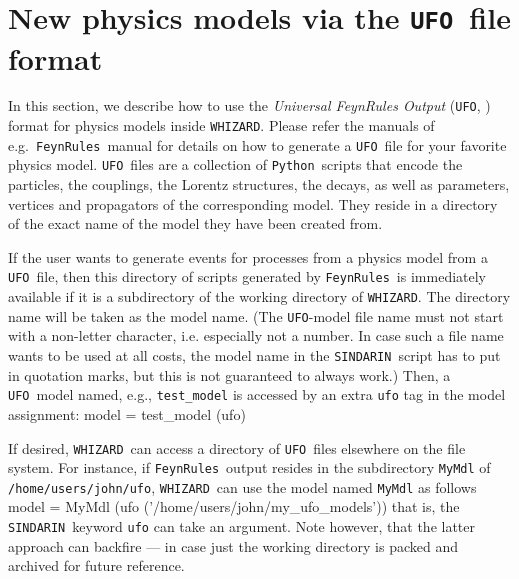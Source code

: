 \documentclass[12pt]{book}
\newenvironment{Code}%
  {\begingroup\footnotesize
   \quote
   \Verbatim[frame=single]}%
  {\endVerbatim
   \endquote
   \endgroup\noindent}
\newcommand{\ttt}[1]{\texttt{#1}}
\newcommand{\whizard}{\ttt{WHIZARD}}
\newcommand{\FeynRules}{\ttt{FeynRules}}
\newcommand{\UFO}{\ttt{UFO}}
\newcommand{\sindarin}{\ttt{SINDARIN}}
\newcommand{\python}{\ttt{Python}}
\begin{document}

\section{New physics models via the \UFO\ file format}
\label{sec:ufo}

In this section, we describe how to use the {\em Universal FeynRules
Output} (\UFO, \cite{Degrande:2011ua,Darme:2023jdn}) format for physics models
inside \whizard. Please refer the manuals of e.g.~\FeynRules\ manual
for details on how to generate a \UFO\ file for your favorite physics
model. \UFO\ files are a collection of \python\ scripts that
encode the particles, the couplings, the Lorentz structures, the
decays, as well as parameters, vertices and propagators of the
corresponding model. They reside in a directory of the exact name of
the model they have been created from.

If the user wants to generate events for processes from a physics
model from a \UFO\ file, then this directory of scripts generated by
\FeynRules\ is immediately available if it is a subdirectory of the working
directory of \whizard.  The directory name will be taken as the model
name. (The \UFO-model file name must not start with a
  non-letter character, i.e. especially not a number.  In case such a
  file name wants to be used at all costs, the model name in the
  \sindarin\ script has to put in quotation marks, but this is not
  guaranteed to always work.)  Then, a \UFO\ model named, e.g.,
\ttt{test\_model} is accessed by an extra \ttt{ufo} tag in the model
assignment:
\begin{Code}
  model = test_model (ufo)
\end{Code}

If desired, \whizard\ can access a directory of \UFO\ files elsewhere
on the file system.  For instance, if \FeynRules\ output resides in
the subdirectory \ttt{MyMdl} of
\ttt{/home/users/john/ufo}, \whizard\ can use the model
named \ttt{MyMdl} as follows
\begin{Code}
  model = MyMdl (ufo ('/home/users/john/my_ufo_models'))
\end{Code}
that is, the \sindarin\ keyword \ttt{ufo} can take an argument.  Note
however, that the latter approach can backfire --- in case just the working
directory is packed and archived for future reference.




\clearpage
\end{document}
